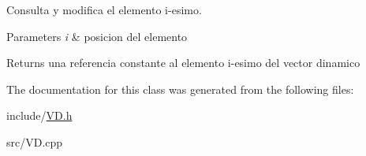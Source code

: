 Consulta y modifica el elemento i-\/esimo. 


\begin{DoxyParams}{Parameters}
{\em i} & posicion del elemento \\
\hline
\end{DoxyParams}
\begin{DoxyReturn}{Returns}
una referencia constante al elemento i-\/esimo del vector dinamico 
\end{DoxyReturn}


The documentation for this class was generated from the following files\+:\begin{DoxyCompactItemize}
\item 
include/\hyperlink{_v_d_8h}{V\+D.\+h}\item 
src/V\+D.\+cpp\end{DoxyCompactItemize}
